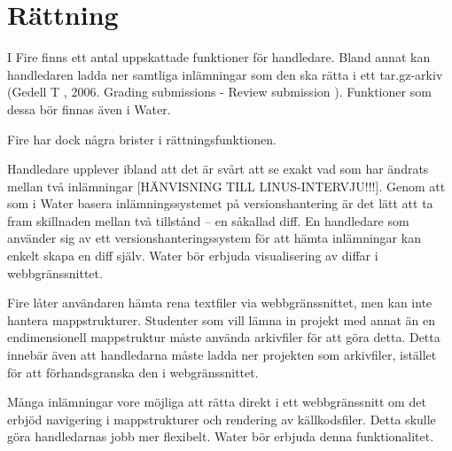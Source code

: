 \section{Rättning}

I Fire finns ett antal uppskattade funktioner för handledare. Bland annat kan handledaren ladda ner samtliga inlämningar som den ska rätta i ett tar.gz-arkiv (Gedell T , 2006. Grading submissions - Review submission ). Funktioner som dessa bör finnas även i Water.

Fire har dock några brister i rättningsfunktionen.

Handledare upplever ibland att det är svårt att se exakt vad som har ändrats mellan två inlämningar [HÄNVISNING TILL LINUS-INTERVJU!!!]. Genom att som i Water basera inlämningssystemet på versionshantering är det lätt att ta fram skillnaden mellan två tillstånd – en såkallad diff. En handledare som använder sig av ett versionshanteringssystem för att hämta inlämningar kan enkelt skapa en diff själv. Water bör erbjuda visualisering av diffar i webbgränssnittet.

Fire låter användaren hämta rena textfiler via webbgränssnittet, men kan inte hantera mappstrukturer. Studenter som vill lämna in projekt med annat än en endimensionell mappstruktur måste använda arkivfiler för att göra detta. Detta innebär även att handledarna måste ladda ner projekten som arkivfiler, istället för att förhandsgranska den i webgränssnittet.

Många inlämningar vore möjliga att rätta direkt i ett webbgränssnitt om det erbjöd navigering i mappstrukturer och rendering av källkodsfiler. Detta skulle göra handledarnas jobb mer flexibelt. Water bör erbjuda denna funktionalitet.
